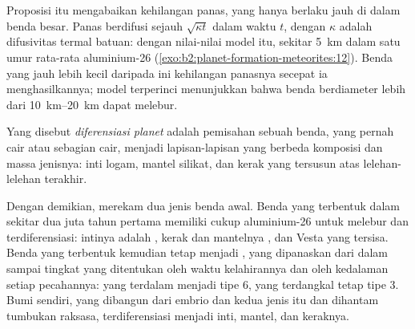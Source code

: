 \begin{omfigure}
\par{}
\end{omfigure}

Proposisi itu mengabaikan kehilangan panas, yang hanya berlaku jauh di dalam benda besar.
Panas berdifusi sejauh $\sqrt{\kappa t}$ dalam waktu $t$, dengan
$\kappa$ adalah difusivitas termal batuan: dengan nilai-nilai model itu,
sekitar \qty{5}{km} dalam satu umur rata-rata aluminium-26 (\cref{exo:b2:planet-formation-meteorites:12}). Benda yang jauh
lebih kecil daripada ini kehilangan panasnya secepat ia menghasilkannya; model terperinci menunjukkan
bahwa benda berdiameter lebih dari \qtyrange{10}{20}{km} dapat melebur.

\begin{definition}
\label{def:b2:planet-formation-meteorites:differentiation}
Yang disebut \emph{diferensiasi planet} adalah
pemisahan sebuah benda, yang pernah cair atau sebagian cair, menjadi lapisan-lapisan yang berbeda
komposisi dan massa jenisnya: inti logam, mantel silikat, dan kerak yang tersusun atas
lelehan-lelehan terakhir.
\end{definition}

Dengan demikian,  merekam dua jenis benda awal. Benda yang terbentuk dalam
sekitar dua juta tahun pertama memiliki cukup aluminium-26 untuk melebur dan
terdiferensiasi: intinya adalah , kerak dan mantelnya
, dan Vesta yang tersisa. Benda yang terbentuk kemudian tetap menjadi
, yang dipanaskan dari dalam sampai tingkat yang ditentukan oleh waktu kelahirannya dan oleh
kedalaman setiap pecahannya: yang terdalam menjadi tipe 6, yang terdangkal tetap
tipe 3. Bumi sendiri, yang dibangun dari embrio dan  kedua jenis itu dan
dihantam tumbukan raksasa, terdiferensiasi menjadi inti, mantel, dan keraknya.

